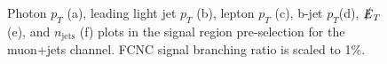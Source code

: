 \begin{figure}[h!]
\hfil
{}
\caption{Photon $p_T$ (a), leading light jet $p_T$ (b), lepton $p_T$ (c), b-jet $p_T$(d), $\slashed{E}_T$ (e), and $n_{\text{jets}}$ (f) plots in the signal region pre-selection for the muon+jets channel.  FCNC signal branching ratio is scaled to 1\%.}
\label{fig:PreSelPlots3}
\end{figure}

